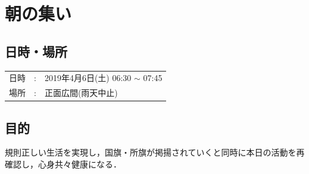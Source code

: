 %

\section{朝の集い}

\subsection{日時・場所}
\begin{tabular}{p{}rp{}}
  日時 & : & 2019年4月6日(土) 06:30 $\sim$ 07:45\\
  場所 & : & 正面広間(雨天中止)　\\
\end{tabular}

\subsection{目的}
規則正しい生活を実現し，国旗・所旗が掲揚されていくと同時に本日の活動を再確認し，心身共々健康になる．


